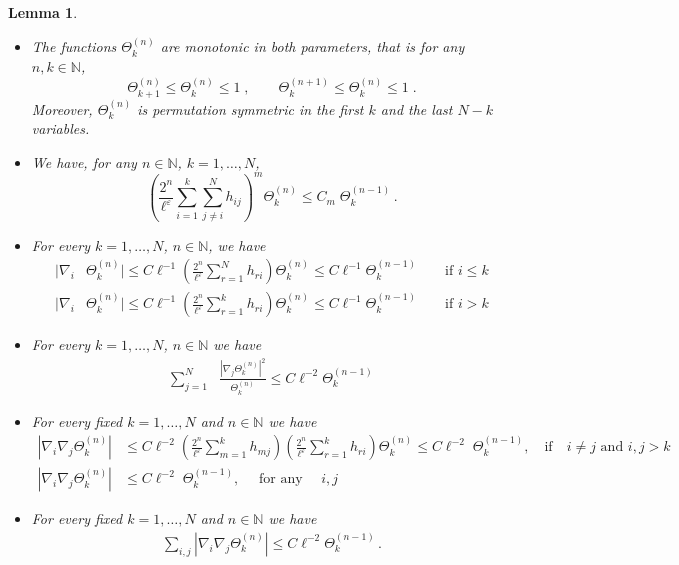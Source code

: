 \documentclass[11pt]{article}
\newtheorem{lemma}[theorem]{Lemma}
\newcommand{\eps}{\varepsilon}
\newcommand{\bN}{{\mathbb N}}
\begin{document}
\begin{lemma}\label{lm:theta}
\begin{itemize}
\item[i)] The functions $\Theta_k^{(n)}$ are monotonic in both
parameters, that is for any $n, k \in \bN$,
\[ \Theta_{k+1}^{(n)}  \leq \Theta_k^{(n)}  \leq 1\; ,\qquad
 \Theta_k^{(n+1)}  \leq \Theta_k^{(n)}  \leq 1 \; .
 \]
Moreover,  $\Theta^{(n)}_k$ is permutation symmetric  in the first
$k$ and the last $N-k$ variables.
\item[ii)] We have, for any $n\in \bN$, $k=1,\dots,N$,
\begin{equation}\label{eq:lmthetaii}
\left( \frac{2^n}{\ell^{\eps}} \sum_{i=1}^k \sum_{j\neq i}^N h_{ij}
\right)^m \Theta_k^{(n)} \leq C_m \; \Theta_k^{(n-1)}\,.
\end{equation}
\item[iii)] For every $k = 1, \dots , N$, $n \in \bN$, we have
\begin{equation}\label{eq:lmthetaiiia}
\begin{split}
|\nabla_i & \Theta_k^{(n)}| \leq C \ell^{-1} \left(
\frac{2^{n}}{\ell^{\eps}} \sum_{r=1}^N h_{ri} \right) \Theta_k^{(n)}
\leq C \ell^{-1}
\Theta_k^{(n-1)} \qquad \text{if } i \leq k \\
|\nabla_i &\Theta_k^{(n)}| \leq C \ell^{-1} \left(
\frac{2^{n}}{\ell^{\eps}} \sum_{r=1}^k h_{ri} \right) \Theta_k^{(n)}
\leq C \ell^{-1} \Theta_k^{(n-1)} \qquad \text{if } i
> k
\end{split}
\end{equation}
\item[iv)] For every $k =1,\dots ,N$, $n \in\bN$ we have
\begin{equation}\label{eq:lmthetaiv}
\begin{split}
\sum_{j=1}^N &\frac{\left| \nabla_j \Theta_k^{(n)}
\right|^2}{\Theta_k^{(n)}} \leq C \ell^{-2} \Theta_k^{(n-1)}
\end{split}
\end{equation}
\item[v)]
For every fixed $k =1,\dots,N$ and $n \in \bN$ we have
\begin{equation}\label{eq:lmthetav}
\begin{split}
\left| \nabla_i \nabla_j \Theta_k^{(n)} \right| &\leq C \ell^{-2}
\left( \frac{2^{n}}{\ell^{\eps}} \sum_{m=1}^k h_{mj} \right) \left(
\frac{2^{n}}{\ell^{\eps}} \sum_{r=1}^k h_{ri} \right) \Theta_k^{(n)}
\leq C \ell^{-2} \; \Theta_k^{(n-1)},
\quad  \text{if} \quad i \neq j \text{ and } i,j >k \\
\left| \nabla_i \nabla_j \Theta_k^{(n)} \right| & \leq C \ell^{-2}
\; \Theta_k^{(n-1)}, \quad \text{ for any } \quad i, j
\end{split}
\end{equation}
\item[vi)] For every fixed $k =1,\dots,N$ and $n \in \bN$ we have
\begin{equation}\label{eq:lmthetavi}
\begin{split}
\sum_{i,j} \left| \nabla_i \nabla_j \Theta_k^{(n)} \right| \leq C
\ell^{-2} \Theta_k^{(n-1)}\,.
\end{split}
\end{equation}
\end{itemize}
\end{lemma}
\end{document}

